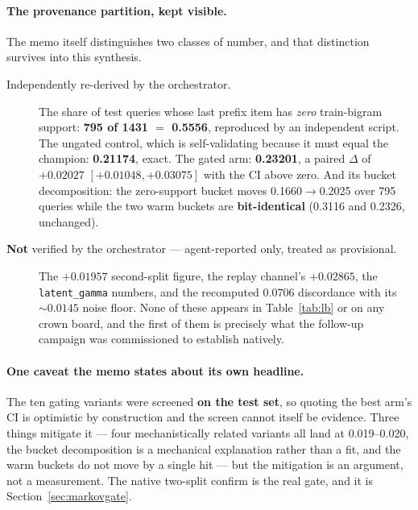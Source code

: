 \documentclass[11pt]{article}
\begin{document}
\paragraph{The provenance partition, kept visible.} The memo itself distinguishes
two classes of number, and that distinction survives into this synthesis.
\begin{description}
  \item[Independently re-derived by the orchestrator.] The share of test queries
  whose last prefix item has \emph{zero} train-bigram support:
  \textbf{\num{795} of \num{1431} $=$ \num{0.5556}}, reproduced by an independent
  script. The ungated control, which is self-validating because it must equal the
  champion: \textbf{\num{0.21174}}, exact. The gated arm: \textbf{\num{0.23201}},
  a paired $\Delta$ of $+\num{0.02027}$ $[+\num{0.01048}, +\num{0.03075}]$ with the
  CI above zero. And its bucket decomposition: the zero-support bucket moves
  \num{0.1660}$\to$\num{0.2025} over \num{795} queries while the two warm buckets
  are \textbf{bit-identical} (\num{0.3116} and \num{0.2326}, unchanged).
  \item[\textbf{Not} verified by the orchestrator --- agent-reported only, treated
  as provisional.] The $+\num{0.01957}$ second-split figure, the replay channel's
  $+\num{0.02865}$, the \texttt{latent\_gamma} numbers, and the recomputed
  \num{0.0706} discordance with its ${\sim}\num{0.0145}$ noise floor. None of these
  appears in Table~\ref{tab:lb} or on any crown board, and the first of them is
  precisely what the follow-up campaign was commissioned to establish natively.
\end{description}

\paragraph{One caveat the memo states about its own headline.} The ten gating
variants were screened \textbf{on the test set}, so quoting the best arm's CI is
optimistic by construction and the screen cannot itself be evidence. Three things
mitigate it --- four mechanistically related variants all land at
\numrange{0.019}{0.020}, the bucket decomposition is a mechanical explanation
rather than a fit, and the warm buckets do not move by a single hit --- but the
mitigation is an argument, not a measurement. The native two-split confirm is the
real gate, and it is Section~\ref{sec:markovgate}.
\end{document}

